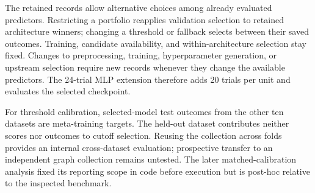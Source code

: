 The retained records allow alternative choices among already evaluated predictors. Restricting a portfolio reapplies validation selection to retained architecture winners; changing a threshold or fallback selects between their saved outcomes. Training, candidate availability, and within-architecture selection stay fixed. Changes to preprocessing, training, hyperparameter generation, or upstream selection require new records whenever they change the available predictors. The 24-trial MLP extension therefore adds 20 trials per unit and evaluates the selected checkpoint.

For threshold calibration, selected-model test outcomes from the other ten datasets are meta-training targets. The held-out dataset contributes neither scores nor outcomes to cutoff selection. Reusing the collection across folds provides an internal cross-dataset evaluation; prospective transfer to an independent graph collection remains untested. The later matched-calibration analysis fixed its reporting scope in code before execution but is post-hoc relative to the inspected benchmark.

